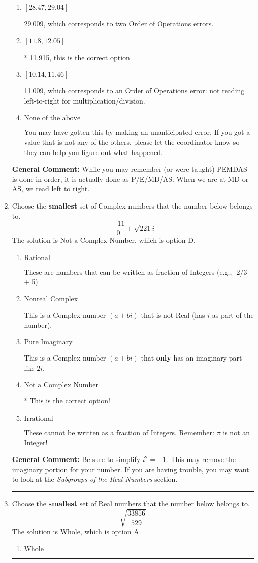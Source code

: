 \documentclass{extbook}[14pt]
\newcommand{\litem}[1]{\item #1

\rule{\textwidth}{0.4pt}}
\begin{document}
\begin{enumerate}
{\begin{enumerate}[label=\Alph*.]
 29.915, which corresponds to an Order of Operations error: multiplying by negative before squaring. For example: $(-3)^2 \neq -3^2$
\item \( [28.47, 29.04] \)

 29.009, which corresponds to two Order of Operations errors.
\item \( [11.8, 12.05] \)

* 11.915, this is the correct option
\item \( [10.14, 11.46] \)

 11.009, which corresponds to an Order of Operations error: not reading left-to-right for multiplication/division.
\item \( \text{None of the above} \)

 You may have gotten this by making an unanticipated error. If you got a value that is not any of the others, please let the coordinator know so they can help you figure out what happened.
\end{enumerate}

\textbf{General Comment:} While you may remember (or were taught) PEMDAS is done in order, it is actually done as P/E/MD/AS. When we are at MD or AS, we read left to right.
}
\litem{
Choose the \textbf{smallest} set of Complex numbers that the number below belongs to.
\[ \frac{-11}{0}+\sqrt{221} i \]The solution is \( \text{Not a Complex Number} \), which is option D.\begin{enumerate}[label=\Alph*.]
\item \( \text{Rational} \)

These are numbers that can be written as fraction of Integers (e.g., -2/3 + 5)
\item \( \text{Nonreal Complex} \)

This is a Complex number $(a+bi)$ that is not Real (has $i$ as part of the number).
\item \( \text{Pure Imaginary} \)

This is a Complex number $(a+bi)$ that \textbf{only} has an imaginary part like $2i$.
\item \( \text{Not a Complex Number} \)

* This is the correct option!
\item \( \text{Irrational} \)

These cannot be written as a fraction of Integers. Remember: $\pi$ is not an Integer!
\end{enumerate}

\textbf{General Comment:} Be sure to simplify $i^2 = -1$. This may remove the imaginary portion for your number. If you are having trouble, you may want to look at the \textit{Subgroups of the Real Numbers} section.
}
\litem{
Choose the \textbf{smallest} set of Real numbers that the number below belongs to.
\[ \sqrt{\frac{33856}{529}} \]The solution is \( \text{Whole} \), which is option A.\begin{enumerate}[label=\Alph*.]
\item \( \text{Whole} \)


\end{enumerate}}
\end{enumerate}
\end{document}
